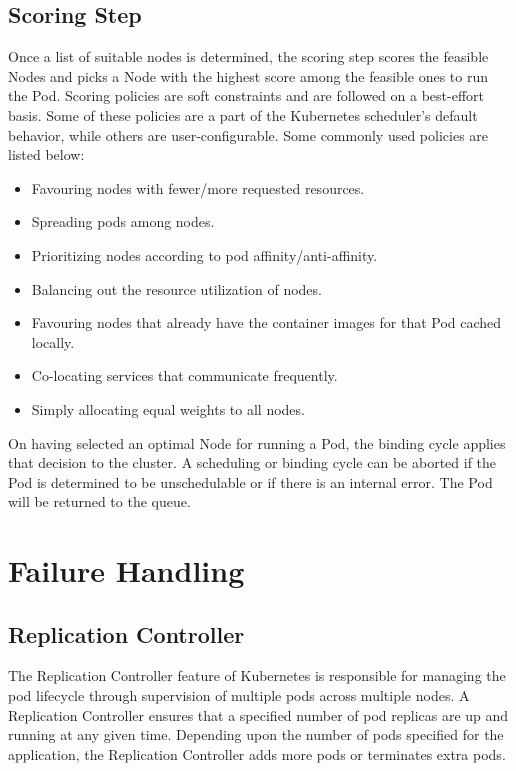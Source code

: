 \documentclass[sigconf]{acmart}
\begin{document}
\subsection{Scoring Step}
Once a list of suitable nodes is determined, the scoring step scores the feasible Nodes and picks a Node with the highest score among the feasible ones to run the Pod. Scoring policies are soft constraints and are followed on a best-effort basis. Some of these policies are a part of the Kubernetes scheduler’s default behavior, while others are user-configurable. Some commonly used policies are listed below:
\begin{itemize}
\item Favouring nodes with fewer/more requested resources.
\item Spreading pods among nodes.
\item Prioritizing nodes according to pod affinity/anti-affinity.
\item Balancing out the resource utilization of nodes.
\item Favouring nodes that already have the container images for that Pod cached locally.
\item Co-locating services that communicate frequently.
\item Simply allocating equal weights to all nodes.
\end{itemize}

On having selected an optimal Node for running a Pod, the binding cycle applies that decision to the cluster. A scheduling or binding cycle can be aborted if the Pod is determined to be unschedulable or if there is an internal error. The Pod will be returned to the queue.

\section{Failure Handling}

\subsection{Replication Controller}
The Replication Controller feature of Kubernetes is responsible for managing the pod lifecycle through supervision of multiple pods across multiple nodes. A Replication Controller ensures that a specified number of pod replicas are up and running at any given time. Depending upon the number of pods specified for the application, the Replication Controller adds more pods or terminates extra pods.
\end{document}
